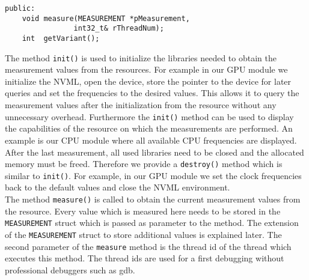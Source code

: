 \begin{description}
\begin{lstlisting}[caption={Methods of the \texttt{CMeasureResource} class that programmers have to implement in order to support a new resource. \added[id=ck]{Listing aktualisiert.}}, label=lst:CMeasureResource]
public:
	void measure(MEASUREMENT *pMeasurement, 
				int32_t& rThreadNum);
	int  getVariant();
	\end{lstlisting}
	
	The method \texttt{init()} is used to initialize the libraries needed to obtain the measurement values from the resources. For example in our GPU module we initialize the NVML, open the device, store the pointer to the device for later queries and set the frequencies to the desired values. This allows it to query the measurement values after the initialization from the resource without any unnecessary overhead. Furthermore the \texttt{init()} method can be used to display the capabilities of the resource on which the measurements are performed. An example is our CPU module where all available CPU frequencies are displayed.\\
	After the last measurement, all used libraries need to be closed and the allocated memory must be freed. Therefore we provide a \texttt{destroy()} method which is similar to \texttt{init()}. For example, in our GPU module we set the clock frequencies back to the default values and close the NVML environment.\\
	The method \texttt{measure()} is called to obtain the current measurement values from the resource. Every value which is measured here needs to be stored in the \texttt{MEASUREMENT} struct which is passed as parameter to the method. The extension of the \texttt{MEASUREMENT} struct to store additional values is explained later. The second parameter of the \texttt{measure} method is the thread id of the thread which executes this method. The thread ids are used for a first debugging without professional debuggers such as gdb.  
	

\end{description}
